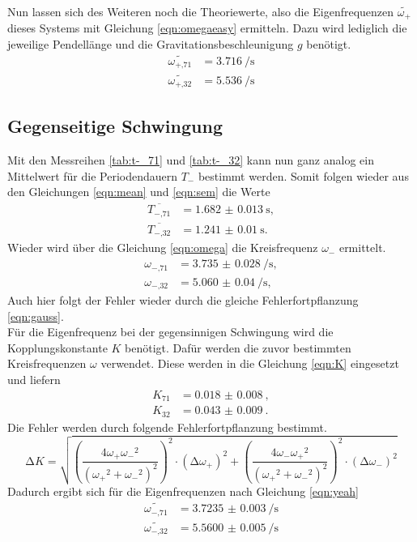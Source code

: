 Nun lassen sich des Weiteren noch die Theoriewerte, also die Eigenfrequenzen $\widetilde{\omega_{+}}$ dieses Systems mit Gleichung \eqref{eqn:omegaeasy} ermitteln. Dazu wird lediglich die jeweilige Pendellänge und die Gravitationsbeschleunigung $g$ \cite{naturkonstanten} benötigt.
\begin{align*}
    \widetilde{\omega_{+\text{,}71}} &= \SI{3.716}{\per\second} \\
    \widetilde{\omega_{+\text{,}32}} &=  \SI{5.536}{\per\second}
\end{align*}

\subsection{Gegenseitige Schwingung}
Mit den Messreihen \ref{tab:t-_71} und \ref{tab:t-_32} kann nun ganz analog ein Mittelwert für die Periodendauern $T_{-}$ bestimmt werden. Somit folgen wieder aus den Gleichungen \eqref{eqn:mean} und \eqref{eqn:sem} die Werte
\begin{align*}
    \overline{T_{-\text{,}71}} &= \SI{1.682(13)}{\second}, \\
    \overline{T_{-\text{,}32}} &= \SI{1.241(10)}{\second}.
\end{align*}
Wieder wird über die Gleichung \eqref{eqn:omega} die Kreisfrequenz $\omega_{-}$ ermittelt.
\begin{align*}
    \omega_{-\text{,}71} &= \SI{3.735(28)}{\per\second}, \\
    \omega_{-\text{,}32} &= \SI{5.060(40)}{\per\second}, 
\end{align*}
Auch hier folgt der Fehler wieder durch die gleiche Fehlerfortpflanzung \eqref{eqn:gauss}.
\\
Für die Eigenfrequenz bei der gegensinnigen Schwingung wird die Kopplungskonstante $K$ benötigt. Dafür werden die zuvor bestimmten Kreisfrequenzen $\omega$ verwendet.
Diese werden in die Gleichung \eqref{eqn:K} eingesetzt und liefern
\begin{align*}
K_{71} &= \SI{0.018(8)}{}, \\
K_{32} &= \SI{0.043(9)}{}.
\end{align*}
Die Fehler werden durch folgende Fehlerfortpflanzung bestimmt.
\begin{equation*}
\increment K = \sqrt{\left(\frac{4{\omega_{+}} {\omega_{-}}^2}{({\omega_{+}}^2 + {\omega_{-}}^2)^2}\right)^2 \cdot (\increment {\omega_{+}})^2 + \left(\frac{4{\omega_{-}} {\omega_{+}}^2}{({\omega_{+}}^2 + {\omega_{-}}^2)^2}\right)^2 \cdot (\increment {\omega_{-}})^2}
\end{equation*}
Dadurch ergibt sich für die Eigenfrequenzen nach Gleichung \eqref{eqn:yeah}
\begin{align*}
    \widetilde{\omega_{-\text{,}71}} &= \SI{3.7235(30)}{\per\second} \\
    \widetilde{\omega_{-\text{,}32}} &=  \SI{5.5600(50)}{\per\second}
\end{align*}

